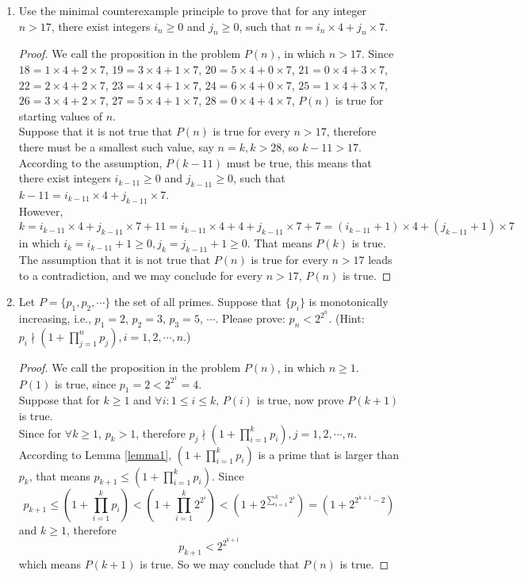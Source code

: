 \documentclass[12pt,a4paper,UTF8]{article}
\theoremstyle{definition}
\begin{document}
\begin{enumerate}
    \item
    Use the minimal counterexample principle to prove that for any integer $n>17$, there exist integers $i_n\ge 0$ and $j_n\ge 0$, such that $n = i_n \times 4 + j_n \times 7$.
    \begin{proof}
        We call the proposition in the problem $ P(n) $, in which $ n > 17 $. Since $ 18 = 1 \times 4 + 2 \times 7 $, $ 19 = 3 \times 4 + 1 \times 7 $, $ 20 = 5 \times 4 + 0 \times 7 $, $ 21 = 0 \times 4 + 3 \times 7 $, $ 22 = 2 \times 4 + 2 \times 7 $, $ 23 = 4 \times 4 + 1 \times 7 $, $ 24 = 6 \times 4 + 0 \times 7 $, $ 25 = 1 \times 4 + 3 \times 7 $, $ 26 = 3 \times 4 + 2 \times 7 $, $ 27 = 5 \times 4 + 1 \times 7 $, $ 28 = 0 \times 4 + 4 \times 7 $, $ P(n) $ is true for starting values of $ n $.\\
        Suppose that it is not true that $ P(n) $ is true for every $ n > 17 $, therefore there must be a smallest such value, say $ n = k, k > 28 $, so $ k-11>17 $. According to the assumption, $ P(k - 11) $ must be true, this means that there exist integers $i_{k - 11} \ge 0$ and $j_{k-11} \ge 0$, such that $k-11 = i_{k - 11} \times 4 + j_{k - 11} \times 7$.\\
        However, $$ k = i_{k - 11} \times 4 + j_{k - 11} \times 7 + 11 = i_{k - 11} \times 4 + 4 + j_{k - 11} \times 7 + 7 = (i_{k - 11} + 1) \times 4 + (j_{k - 11} + 1) \times 7 $$ in which $ i_k = i_{k-11} + 1 \geq 0, j_k = j_{k-11} + 1 \geq 0 $. That means $ P(k) $ is true. The assumption that it is not true that $ P(n) $ is true for every $ n > 17 $ leads to a contradiction, and we may conclude for every $ n > 17 $, $ P(n) $ is true.
    \end{proof}

    \item
    Let $P=\{p_1, p_2, \cdots\}$ the set of all primes. Suppose that $\{p_i\}$ is monotonically    increasing, i.e., $p_1=2$, $p_2=3$, $p_3=5$, $\cdots$. Please prove: $p_n<2^{2^n}$. {\color{blue}(Hint: $p_i \nmid (1+\prod_{j=1}^n p_j), i=1,2,\cdots,n$.)}
    \begin{proof}
        We call the proposition in the problem $ P(n) $, in which $ n \geq 1 $.\\
        $ P(1) $ is true, since $ p_1 = 2 < 2^{2^1} = 4 $.\\
        Suppose that for  $ k \geq 1 $ and $ {\forall}i: 1 \leq i \leq k $, $ P(i) $ is true, now prove $ P(k+1) $ is true.\\
        Since for $ {\forall} k \geq 1 $, $ p_k>1 $, therefore $p_j \nmid (1+\prod_{i=1}^k p_i), j=1,2,\cdots,n $. According to Lemma \ref{lemma1}, $ (1+\prod_{i=1}^k p_i) $ is a prime that is larger than $ p_k $, that means $ p_{k+1} \leq (1+\prod_{i=1}^k p_i) $. Since
        $$ p_{k+1} \leq (1+\prod_{i=1}^k p_i) < (1+\prod_{i=1}^k 2^{2^i}) < (1+2^{\sum_{i=1}^k 2^i}) = (1+2^{2^{k+1}-2}) $$
        and $ k \geq 1 $, therefore 
        $$ p_{k+1} < 2^{2^{k+1}} $$
        which means $ P(k+1) $ is true.
        So we may conclude that $ P(n) $ is true.
    \end{proof}


\end{enumerate}
\end{document}
